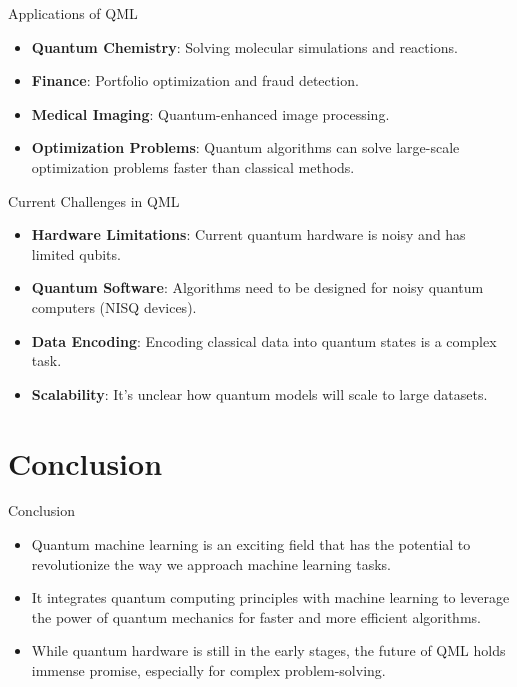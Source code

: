 \documentclass{beamer}
\begin{document}
\begin{frame}{Applications of QML}
    \begin{itemize}
        \item \textbf{Quantum Chemistry}: Solving molecular simulations and reactions.
        \item \textbf{Finance}: Portfolio optimization and fraud detection.
        \item \textbf{Medical Imaging}: Quantum-enhanced image processing.
        \item \textbf{Optimization Problems}: Quantum algorithms can solve large-scale optimization problems faster than classical methods.
    \end{itemize}
\end{frame}

\begin{frame}{Current Challenges in QML}
    \begin{itemize}
        \item \textbf{Hardware Limitations}: Current quantum hardware is noisy and has limited qubits.
        \item \textbf{Quantum Software}: Algorithms need to be designed for noisy quantum computers (NISQ devices).
        \item \textbf{Data Encoding}: Encoding classical data into quantum states is a complex task.
        \item \textbf{Scalability}: It's unclear how quantum models will scale to large datasets.
    \end{itemize}
\end{frame}

\section{Conclusion}

\begin{frame}{Conclusion}
    \begin{itemize}
        \item Quantum machine learning is an exciting field that has the potential to revolutionize the way we approach machine learning tasks.
        \item It integrates quantum computing principles with machine learning to leverage the power of quantum mechanics for faster and more efficient algorithms.
        \item While quantum hardware is still in the early stages, the future of QML holds immense promise, especially for complex problem-solving.
    \end{itemize}
\end{frame}
\end{document}
